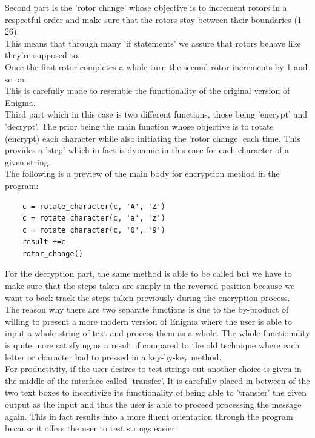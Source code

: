 \documentclass[conference,compsoc]{IEEEtran}
\begin{document}
Second part is the 'rotor change' whose objective is to increment rotors in a respectful order and make sure that the rotors stay between their boundaries (1-26).\\
This means that through many 'if statements' we assure that rotors behave like they're supposed to.\\
Once the first rotor completes a whole turn the second rotor increments by 1 and so on.\\
This is carefully made to resemble the functionality of the original version of Enigma.\\

Third part which in this case is two different functions, those being 'encrypt' and 'decrypt'. The prior being the main function whose objective is to rotate (encrypt) each character while also initiating the 'rotor change' each time. This provides a 'step' which in fact is dynamic in this case for each character of a given string.\\

The following is a preview of the main body for encryption method in the program:
\begin{verbatim}
    c = rotate_character(c, 'A', 'Z')
    c = rotate_character(c, 'a', 'z')
    c = rotate_character(c, '0', '9')
    result +=c
    rotor_change()
\end{verbatim}

For the decryption part, the same method is able to be called but we have to make sure that the steps taken are simply in the reversed position because we want to back track the steps taken previously during the encryption process.\\

The reason why there are two separate functions is due to the by-product of willing to present a more modern version of Enigma where the user is able to input a whole string of text and process them as a whole. The whole functionality is quite more satisfying as a result if compared to the old technique where each letter or character had to pressed in a key-by-key method.\\

For productivity, if the user desires to test strings out another choice is given in the middle of the interface called 'transfer'. It is carefully placed in between of the two text boxes to incentivize its functionality of being able to 'transfer' the given output as the input and thus the user is able to proceed processing the message again. This in fact results into a more fluent orientation through the program because it offers the user to test strings easier.  \\
\end{document}
